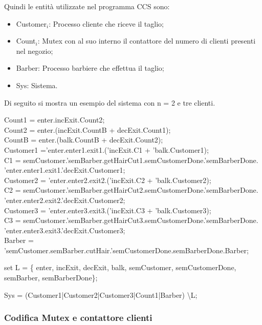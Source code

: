 Quindi le entità utilizzate nel programma CCS sono:
\begin{itemize}
	\item \textsf{Customer$_{i}$}: Processo cliente che riceve il taglio;
	\item \textsf{Count$_{i}$}: \textsf{Mutex} con al suo interno il contattore del numero di clienti presenti nel negozio;
	\item \textsf{Barber}: Processo barbiere che effettua il taglio;
	\item \textsf{Sys}: Sistema.
\end{itemize}

Di seguito si mostra un esempio del sistema con n = 2 e tre clienti.

\textsf{Count1 = enter.incExit.Count2};\\
\textsf{Count2 = enter.(incExit.CountB + decExit.Count1)};\\
\textsf{CountB = enter.(balk.CountB + decExit.Count2)};\\

\textsf{Customer1 ='enter.enter1.exit1.('incExit.C1 + 'balk.Customer1)};\\
\textsf{C1 = semCustomer.'semBarber.getHairCut1.semCustomerDone.'semBarberDone.\\'enter.enter1.exit1.'decExit.Customer1};\\

\textsf{Customer2 = 'enter.enter2.exit2.('incExit.C2 + 'balk.Customer2)};\\
\textsf{C2 = semCustomer.'semBarber.getHairCut2.semCustomerDone.'semBarberDone.\\'enter.enter2.exit2.'decExit.Customer2};\\

\textsf{Customer3 = 'enter.enter3.exit3.('incExit.C3 + 'balk.Customer3)};\\
\textsf{C3 = semCustomer.'semBarber.getHairCut3.semCustomerDone.'semBarberDone.\\'enter.enter3.exit3.'decExit.Customer3};\\

\textsf{Barber = 'semCustomer.semBarber.cutHair.'semCustomerDone.semBarberDone.Barber};

\textsf{set L = \{ enter, incExit, decExit, balk, semCustomer, semCustomerDone, semBarber, semBarberDone\}};

\textsf{Sys = (Customer1|Customer2|Customer3|Count1|Barber) \textbackslash L;}

\subsubsection{Codifica Mutex e contattore clienti}


